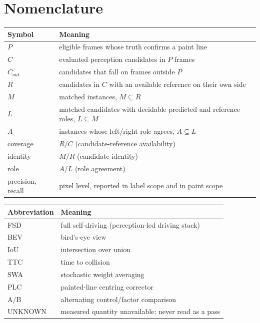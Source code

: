 \documentclass[journal]{IEEEtran}
\begin{document}
\section*{Nomenclature}
\begin{table}[!t]
\centering
\begin{tabular}{@{}ll@{}}
\toprule
Symbol & Meaning \\
\midrule
$P$ & eligible frames whose truth confirms a paint line \\
$C$ & evaluated perception candidates in $P$ frames \\
$C_{out}$ & candidates that fall on frames outside $P$ \\
$R$ & candidates in $C$ with an available reference on their own side \\
$M$ & matched instances, $M \subseteq R$ \\
$L$ & matched candidates with decidable predicted and reference roles, $L \subseteq M$ \\
$A$ & instances whose left/right role agrees, $A \subseteq L$ \\
coverage & $R/C$ (candidate-reference availability) \\
identity & $M/R$ (candidate identity) \\
role & $A/L$ (role agreement) \\
precision, recall & pixel level, reported in label scope and in paint scope \\
\bottomrule
\end{tabular}
\end{table}
\begin{table}[!t]
\centering
\begin{tabular}{@{}ll@{}}
\toprule
Abbreviation & Meaning \\
\midrule
FSD & full self-driving (perception-led driving stack) \\
BEV & bird's-eye view \\
IoU & intersection over union \\
TTC & time to collision \\
SWA & stochastic weight averaging \\
PLC & painted-line centring corrector \\
A/B & alternating control/factor comparison \\
UNKNOWN & measured quantity unavailable; never read as a pass \\
\bottomrule
\end{tabular}
\end{table}
\end{document}
